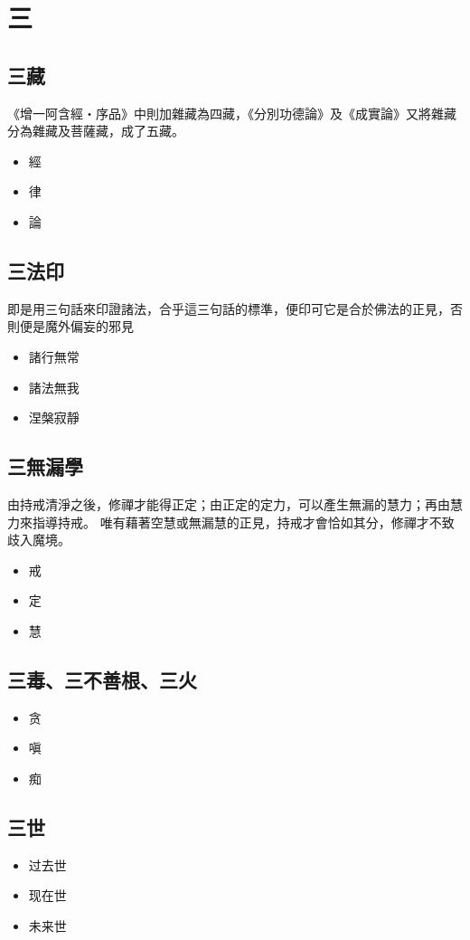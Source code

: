 \section{三}

\subsection{三藏}
《增一阿含經‧序品》中則加雜藏為四藏，《分別功德論》及《成實論》又將雜藏分為雜藏及菩薩藏，成了五藏。
\begin{itemize}
  \item 經 \item 律 \item 論
\end{itemize}


\subsection{三法印}
即是用三句話來印證諸法，合乎這三句話的標準，便印可它是合於佛法的正見，否則便是魔外偏妄的邪見
\begin{itemize}
  \item 諸行無常
  \item 諸法無我
  \item 涅槃寂靜
\end{itemize}

\subsection{三無漏學}
由持戒清淨之後，修禪才能得正定；由正定的定力，可以產生無漏的慧力；再由慧力來指導持戒。
唯有藉著空慧或無漏慧的正見，持戒才會恰如其分，修禪才不致歧入魔境。
\begin{itemize}
  \item 戒
  \item 定
  \item 慧
\end{itemize}

\subsection{三毒、三不善根、三火}
\begin{itemize}
  \item 贪
  \item 嗔
  \item 痴
\end{itemize}



\subsection{三世}
\begin{itemize}
  \item 过去世
  \item 现在世
  \item 未来世
\end{itemize}

